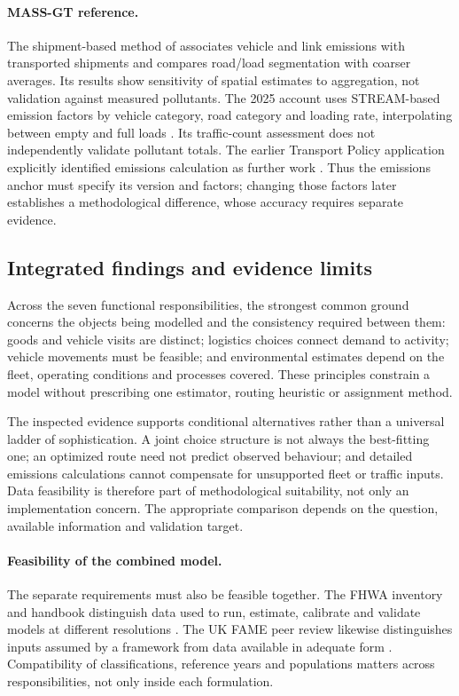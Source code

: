 \paragraph{MASS-GT reference.}
The shipment-based method of \textcite{thoen2020emissions} associates vehicle
and link emissions with transported shipments and compares road/load
segmentation with coarser averages. Its results show sensitivity of spatial
estimates to aggregation, not validation against measured pollutants.
The 2025 account uses STREAM-based emission factors by vehicle category,
road category and loading rate, interpolating between empty and full loads
\parencite{massgt2025}. Its traffic-count assessment does not independently
validate pollutant totals. The earlier Transport Policy application explicitly
identified emissions calculation as further work \parencite{massgt2022}.
Thus the emissions anchor must specify its version and factors; changing those
factors later establishes a methodological difference, whose accuracy requires
separate evidence.

\subsection{Integrated findings and evidence limits}\label{sec:discussion}
Across the seven functional responsibilities, the strongest common ground concerns the objects
being modelled and the consistency required between them: goods and vehicle
visits are distinct; logistics choices connect demand to activity; vehicle
movements must be feasible; and environmental estimates depend on the fleet,
operating conditions and processes covered. These principles constrain a model
without prescribing one estimator, routing heuristic or assignment method.

The inspected evidence supports conditional alternatives rather than a universal
ladder of sophistication. A joint choice structure is not always the best-fitting
one; an optimized route need not predict observed behaviour; and detailed
emissions calculations cannot compensate for unsupported fleet or traffic
inputs. Data feasibility is therefore part of methodological suitability, not
only an implementation concern. The appropriate comparison depends on the
question, available information and validation target.

\paragraph{Feasibility of the combined model.}
The separate requirements must also be feasible together. The FHWA inventory
and handbook distinguish data used to run, estimate, calibrate and validate
models at different resolutions \parencite{fhwa2018,fhwa2017}. The UK FAME
peer review likewise distinguishes inputs assumed by a framework from data
available in adequate form \parencite{williams2024}. Compatibility of
classifications, reference years and populations matters across responsibilities,
not only inside each formulation.


